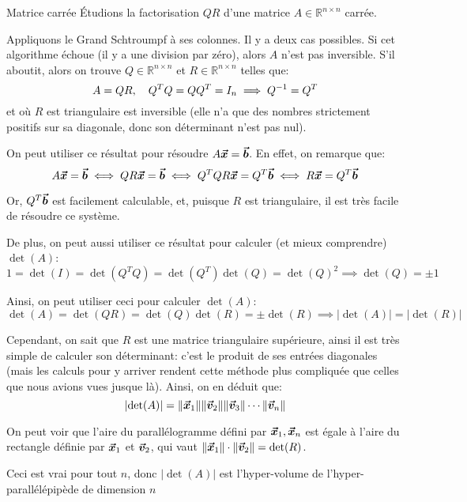 \documentclass[a4paper]{article}
\begin{document}
\begin{parag}{Matrice carrée}
    Étudions la factorisation $QR$ d'une matrice $A \in \mathbb{R}^{n \times n}$ carrée. 

    Appliquons le Grand Schtroumpf à ses colonnes. Il y a deux cas possibles. Si cet algorithme échoue (il y a une division par zéro), alors $A$ n'est pas inversible. S'il aboutit, alors on trouve $Q \in \mathbb{R}^{n \times n}$ et $R \in \mathbb{R}^{n \times n}$ telles que: 
    \[A = QR, \quad Q^T Q = Q Q^T = I_n \implies Q^{-1} = Q^T\]
    et où $R$ est triangulaire est inversible (elle n'a que des nombres strictement positifs sur sa diagonale, donc son déterminant n'est pas nul).

    On peut utiliser ce résultat pour résoudre $A \bm{\protect\vec{x}} = \bm{\protect\vec{b}}$. En effet, on remarque que:
    \[A \bm{\protect\vec{x}} = \bm{\protect\vec{b}} \iff QR \bm{\protect\vec{x}} = \bm{\protect\vec{b}} \iff Q^T Q R \bm{\protect\vec{x}} = Q^T \bm{\protect\vec{b}} \iff R \bm{\protect\vec{x}} = Q^T \bm{\protect\vec{b}}\]
    
    Or, $Q^T \bm{\protect\vec{b}}$ est facilement calculable, et, puisque $R$ est triangulaire, il est très facile de résoudre ce système.

    De plus, on peut aussi utiliser ce résultat pour calculer (et mieux comprendre) $\det\left(A\right)$: 
    \[1 = \det\left(I\right) = \det\left(Q^T Q\right) = \det\left(Q^T\right) \det\left(Q\right) = \det\left(Q\right)^2 \implies \det\left(Q\right) = \pm 1\]
    
    Ainsi, on peut utiliser ceci pour calculer $\det\left(A\right)$: 
    \[\det\left(A\right) = \det\left(QR\right) = \det\left(Q\right)\det\left(R\right) = \pm\det\left(R\right) \implies \left|\det\left(A\right)\right| = \left|\det\left(R\right)\right|\]
    
    Cependant, on sait que $R$ est une matrice triangulaire supérieure, ainsi il est très simple de calculer son déterminant: c'est le produit de ses entrées diagonales (mais les calculs pour y arriver rendent cette méthode plus compliquée que celles que nous avions vues jusque là). Ainsi, on en déduit que: 
    \[\left|\det\left(A\right)\right| = \left\|\bvec{x}_1\right\| \left\|\bvec{v}_2\right\| \left\|\bvec{v}_3\right\|\cdots \left\|\bvec{v}_n\right\|\]
    

    On peut voir que l'aire du parallélogramme défini par $\bm{\protect\vec{x}}_1, \bm{\protect\vec{x}}_n$ est égale à l'aire du rectangle définie par $\bm{\protect\vec{x}}_1$ et $\bm{\protect\vec{v}}_2$, qui vaut $\left\|\bvec{x}_1\right\| \cdot \left\|\bvec{v}_2\right\| = \det\left(R\right)$.

    Ceci est vrai pour tout $n$, donc $\left|\det\left(A\right)\right|$ est l'hyper-volume de l'hyper-parallélépipède de dimension $n$

\end{parag}
\end{document}
